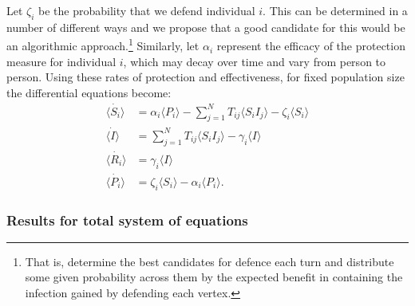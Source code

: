 \documentclass[../report.tex]{subfiles}
\begin{document}
Let $\zeta_i$ be the probability that we defend individual $i$. This can be determined in a number of different ways and we propose that a good candidate for this would be an algorithmic approach.\footnote{That is, determine the best candidates for defence each turn and distribute some given probability across them by the expected benefit in containing the infection gained by defending each vertex.} Similarly, let $\alpha_i$ represent the efficacy of the protection measure for individual $i$, which may decay over time and vary from person to person. Using these rates of protection and effectiveness, for fixed population size the differential equations become:
\begin{align}
\dot{\langle S_i \rangle} & = \alpha_i \langle P_i \rangle - \sum^{N}_{j=1}T_{ij} \langle S_i I_j \rangle - \zeta_i\langle S_i \rangle\\
\dot{\langle I \rangle} & =\sum^{N}_{j=1}T_{ij}\langle S_i I_j \rangle - \gamma_i \langle I \rangle \\
\dot{\langle R_i \rangle} & = \gamma_i \langle I \rangle \\
\dot{\langle P_i \rangle} & = \zeta_i \langle S_i \rangle - \alpha_i \langle P_i \rangle.
\end{align} 

\subsubsection{Results for total system of equations}
\end{document}
